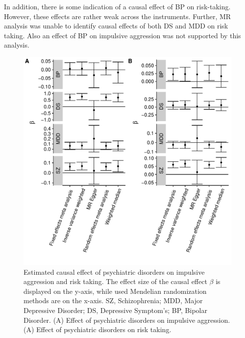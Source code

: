 In addition, there is some indication of a causal effect of BP on risk-taking.
However, these effects are rather weak across the  instruments.
Further, MR analysis was unable to identify causal effects of both DS and MDD on risk taking.
Also an effect of BP on impulsive aggression was not supported by this analysis.
\begin{figure}[htpb]
  \centering
  \includegraphics[width=0.9\linewidth]{ukb_psychiatric/figures/overall_mr_effect.pdf}
  \caption[Estimated Causal Effects]{Estimated causal effect of psychiatric disorders on impulsive aggression and risk taking.
    The effect size of the causal effect $\beta$ is displayed on the y-axis, while used Mendelian randomization methods are on the x-axis.
    SZ, Schizophrenia; MDD, Major Depressive Disorder; DS, Depressive Symptom's; BP, Bipolar Disorder.
    (A) Effect of psychiatric disorders on impulsive aggression.
    (A) Effect of psychiatric disorders on risk taking.
  }\label{fig:overall_mr_effect}
\end{figure}

